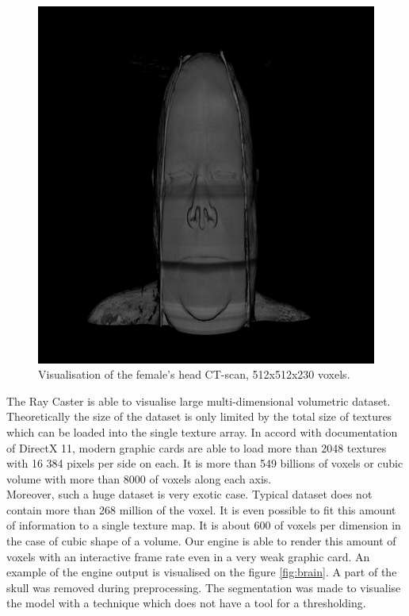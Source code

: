 \documentclass[twoside, english, 11pt]{report}
\begin{document}
\begin{figure}[H]
\centerline{\includegraphics[scale = 0.5]{img/head}}
\caption{Visualisation of the female's head CT-scan, 512x512x230 voxels.\label{fig:head}}
\end{figure}

The Ray Caster is able to visualise large multi-dimensional volumetric dataset. Theoretically the size of the dataset is only limited by the total size of textures which can be loaded into the single texture array. In accord with documentation of DirectX 11, modern graphic cards are able to load more than 2048 textures with 16 384 pixels per side on each. It is more than 549 billions of voxels or cubic volume with more than 8000 of voxels along each axis.\\

Moreover, such a huge dataset is very exotic case. Typical dataset does not contain more than 268 million of the voxel. It is even possible to fit this amount of information to a single texture map. It is about 600 of voxels per dimension in the case of cubic shape of a volume. Our engine is able to render this amount of voxels with an interactive frame rate even in a very weak graphic card. An example of the engine output is visualised on the figure \ref{fig:brain}. A part of the skull was removed during preprocessing. The segmentation was made to visualise the model with a technique which does not have a tool for a thresholding.\\
\end{document}
